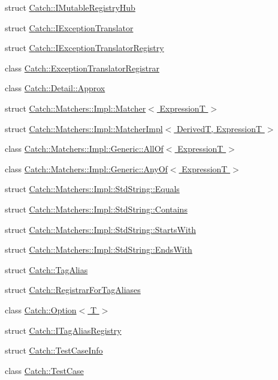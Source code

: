 \begin{DoxyCompactItemize}
struct \hyperlink{a00038}{Catch\+::\+I\+Mutable\+Registry\+Hub}
\item 
struct \hyperlink{a00032}{Catch\+::\+I\+Exception\+Translator}
\item 
struct \hyperlink{a00033}{Catch\+::\+I\+Exception\+Translator\+Registry}
\item 
class \hyperlink{a00027}{Catch\+::\+Exception\+Translator\+Registrar}
\item 
class \hyperlink{a00003}{Catch\+::\+Detail\+::\+Approx}
\item 
struct \hyperlink{a00047}{Catch\+::\+Matchers\+::\+Impl\+::\+Matcher$<$ Expression\+T $>$}
\item 
struct \hyperlink{a00048}{Catch\+::\+Matchers\+::\+Impl\+::\+Matcher\+Impl$<$ Derived\+T, Expression\+T $>$}
\item 
class \hyperlink{a00001}{Catch\+::\+Matchers\+::\+Impl\+::\+Generic\+::\+All\+Of$<$ Expression\+T $>$}
\item 
class \hyperlink{a00002}{Catch\+::\+Matchers\+::\+Impl\+::\+Generic\+::\+Any\+Of$<$ Expression\+T $>$}
\item 
struct \hyperlink{a00017}{Catch\+::\+Matchers\+::\+Impl\+::\+Std\+String\+::\+Equals}
\item 
struct \hyperlink{a00013}{Catch\+::\+Matchers\+::\+Impl\+::\+Std\+String\+::\+Contains}
\item 
struct \hyperlink{a00076}{Catch\+::\+Matchers\+::\+Impl\+::\+Std\+String\+::\+Starts\+With}
\item 
struct \hyperlink{a00016}{Catch\+::\+Matchers\+::\+Impl\+::\+Std\+String\+::\+Ends\+With}
\item 
struct \hyperlink{a00084}{Catch\+::\+Tag\+Alias}
\item 
struct \hyperlink{a00066}{Catch\+::\+Registrar\+For\+Tag\+Aliases}
\item 
class \hyperlink{a00063}{Catch\+::\+Option$<$ T $>$}
\item 
struct \hyperlink{a00044}{Catch\+::\+I\+Tag\+Alias\+Registry}
\item 
struct \hyperlink{a00086}{Catch\+::\+Test\+Case\+Info}
\item 
class \hyperlink{a00085}{Catch\+::\+Test\+Case}
\end{DoxyCompactItemize}
